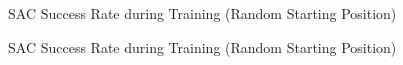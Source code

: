 \begin{figure}[H]%
    \centering
    {\fontsize{8}{11}\selectfont}
    \caption{SAC Success Rate during Training (Random Starting Position)}
    \label{fig:reward_rp}
\end{figure}

\begin{figure}[H]%
    \centering
    {\fontsize{8}{11}\selectfont}
    \caption{SAC Success Rate during Training (Random Starting Position)}
    \label{fig:success_rate_rp}
\end{figure}
